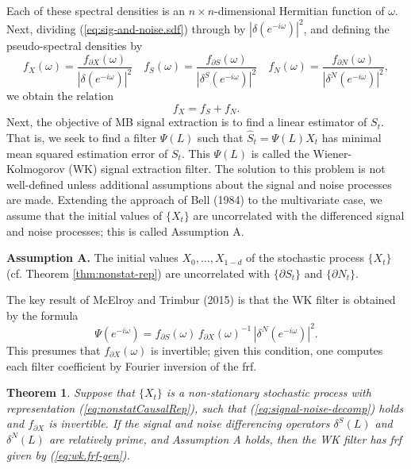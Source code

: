 \documentclass[a4paper]{book}
\newtheorem{Theorem}{Theorem}
\begin{document}
  Each of these spectral densities
   is an $n \times n$-dimensional Hermitian function of $\omega$.
   Next, dividing (\ref{eq:sig-and-noise.sdf}) through by ${| \delta (e^{-i\omega}) |}^2$,
  and defining the pseudo-spectral densities by
\begin{equation}
\label{eq:pseudo-sdf}
  f_X (\omega) = \frac{ f_{\partial X} (\omega)}{ {| \delta (e^{-i\omega}) |}^2 }
  \quad   f_S (\omega) = \frac{ f_{\partial S} (\omega)}{ {| \delta^S (e^{-i\omega}) |}^2 }
  \quad   f_N (\omega) = \frac{ f_{\partial N} (\omega)}{ {| \delta^N (e^{-i\omega}) |}^2 },
\end{equation}
  we obtain the relation
\[
  f_X = f_S + f_N.
\]
 Next, the objective of MB signal extraction is to find a linear estimator 
   of $S_t$.  That is,  we seek to find a filter $\Psi (L)$ such that
  $\widehat{S}_{t} = \Psi (L) X_t$ has minimal mean squared estimation error of
   $S_{t}$.   This $\Psi (L)$ is called the Wiener-Kolmogorov (WK) signal extraction filter.
   The solution to this problem is not well-defined unless 
   additional assumptions about the signal and noise processes are made.  
   Extending the approach of Bell (1984) to the multivariate case,
   we assume that the initial values of $\{ X_t \}$ are uncorrelated with
    the differenced signal and noise processes; this is called Assumption A.
    
   {\bf Assumption A.}  The initial values   $X_0, \ldots, X_{1-d}$
   of the stochastic process  $\{ X_t \}$ (cf. Theorem  \ref{thm:nonstat-rep})
      are uncorrelated with $\{ \partial S_t \}$ and $\{ \partial N_t \}$.

\vspace{.25cm}
 
   
   The key result of McElroy and Trimbur (2015) is that the WK filter is
   obtained by the formula
  \begin{equation}
  \label{eq:wk.frf-gen}
    \Psi (e^{-i \omega}) =   f_{\partial S} (\omega) \, 
    { f_{\partial X} (\omega) }^{-1} \, {| \delta^N (e^{-i \omega}) |}^2.
  \end{equation}
  This presumes that $f_{\partial X} (\omega) $ is invertible; given this condition,
    one computes each filter coefficient by Fourier inversion of the frf.  
    
\begin{Theorem}
\label{thm:wk}
 Suppose that $\{ X_t \}$ is  a non-stationary stochastic process
 with representation (\ref{eq:nonstatCausalRep}), such that
 (\ref{eq:signal-noise-decomp}) holds and $f_{\partial X}$ is invertible.
 If the signal and noise differencing operators
 $\delta^S (L)$ and $\delta^N (L)$ are relatively prime, and Assumption A holds,
 then the WK filter has frf given by (\ref{eq:wk.frf-gen}).
\end{Theorem}
 
\end{document}

